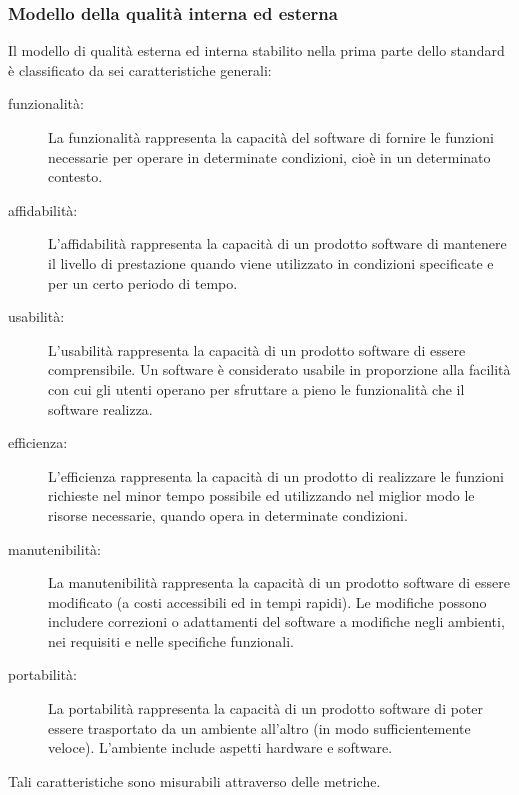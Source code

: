 \documentclass[../PianoDiQualifica.tex]{subfiles}
\begin{document}
\begin{appendices}
		\subsubsection{Modello della qualità interna ed esterna}
		Il modello di qualità esterna ed interna stabilito nella prima parte dello standard è classificato da sei caratteristiche generali:
		\begin{description}
			\item[funzionalità:] La funzionalità rappresenta la capacità del software di fornire le funzioni necessarie per operare in determinate condizioni, cioè in un determinato contesto.
			\item[affidabilità:] L'affidabilità rappresenta la capacità di un prodotto software di mantenere il livello di prestazione quando viene utilizzato in condizioni specificate e per un certo periodo di tempo.
			\item[usabilità:] L'usabilità rappresenta la capacità di un prodotto software di essere comprensibile. Un software è considerato usabile in proporzione alla facilità con cui gli utenti operano per sfruttare a pieno le funzionalità che il software realizza.
			\item[efficienza:] L'efficienza rappresenta la capacità di un prodotto di realizzare le funzioni richieste nel minor tempo possibile ed utilizzando nel miglior modo le risorse necessarie, quando opera in determinate condizioni.
			\item[manutenibilità:] La manutenibilità rappresenta la capacità di un prodotto software di essere modificato (a costi accessibili ed in tempi rapidi). Le modifiche possono includere correzioni o adattamenti del software a modifiche negli ambienti, nei requisiti e nelle specifiche funzionali.
			\item[portabilità:] La portabilità rappresenta la capacità di un prodotto software di poter essere trasportato da un ambiente all'altro (in modo sufficientemente veloce). L'ambiente include aspetti hardware e software.
		\end{description}
		Tali caratteristiche sono misurabili attraverso delle metriche.
		

\end{appendices}
\end{document}
